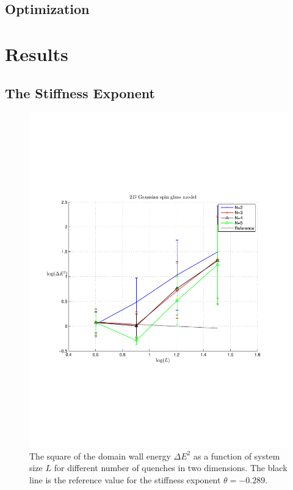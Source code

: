 \documentclass[paper=a4, fontsize=11pt]{scrartcl} %
\numberwithin{equation}{section} %
\numberwithin{figure}{section} %
\numberwithin{table}{section} %
\begin{document}
\subsection{Optimization}

\section{Results}
\label{sec:results}

\subsection{The Stiffness Exponent}

\begin{figure}[hbtp]
\centering
\includegraphics[width=\textwidth]{images/spinglass2D.pdf}
\caption{The square of the domain wall energy $\Delta E ^ 2$ as a function of system size $L$ for different number of quenches in two dimensions. The black line is the reference value for the stiffness exponent $\theta=-0.289$.}
\label{fig:E_2D}
\end{figure}
\end{document}
